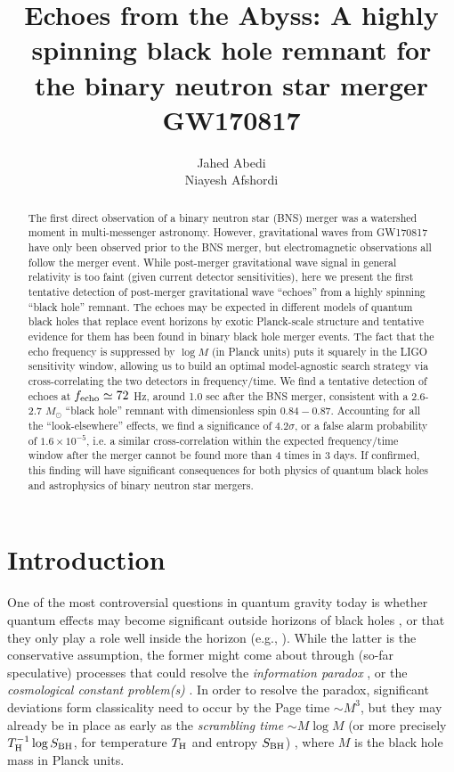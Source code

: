 \documentclass[12pt]{article}
\title{\Large Echoes from the Abyss: A highly spinning black hole remnant for the binary neutron star merger GW170817}
\author{Jahed Abedi \\ Niayesh Afshordi}
\begin{document}
\maketitle

\begin{abstract}
The first direct observation of a binary neutron star (BNS) merger was a watershed moment in multi-messenger astronomy.  However, gravitational waves from GW170817 have only been observed prior to the BNS merger, but electromagnetic observations all follow the merger event. While post-merger gravitational wave signal in general relativity is too faint (given current detector sensitivities), here we present the first tentative detection of post-merger gravitational wave ``echoes'' from a highly spinning ``black hole'' remnant. The echoes may be expected in different models of quantum black holes that replace event horizons by exotic Planck-scale structure and tentative evidence for them has been found in binary black hole merger events.  The fact that the echo frequency is suppressed by $\log M$ (in Planck units) puts it squarely in the LIGO sensitivity window, allowing us to build an optimal model-agnostic search strategy via cross-correlating the two detectors in frequency/time. We find a tentative detection of echoes at $f_{\rm echo} \simeq 72$ Hz, around 1.0 sec after the BNS merger, consistent with a 2.6-2.7 $M_\odot$ ``black hole'' remnant with dimensionless spin $0.84-0.87$. Accounting for all the ``look-elsewhere'' effects, we find a significance of $4.2 \sigma$, or a false alarm probability of $1.6\times 10^{-5}$, i.e. a similar cross-correlation within the expected frequency/time window after the merger cannot be found more than 4 times in 3 days. If confirmed, this finding will have significant consequences for both physics of quantum black holes and astrophysics of binary neutron star mergers.
\end{abstract}


\newpage
\section{Introduction}\label{Introduction}
One of the most controversial questions in quantum gravity today is whether quantum effects may become significant outside horizons of black holes \cite{Braunstein:2009my,Almheiri:2012rt,Maldacena:2013xja,Giddings:2017mym}, or that they only play a role well inside the horizon (e.g., \cite{Abedi:2015yga}).  While the latter is the conservative assumption, the former might come about through (so-far speculative) processes that could resolve the {\it information paradox} \cite{Almheiri:2012rt,Lunin:2001jy,Lunin:2002qf,Maldacena:2013xja}, or the {\it cosmological constant problem(s)} \cite{PrescodWeinstein:2009mp}. In order to resolve the paradox, significant deviations form classicality need to occur by the Page time $\sim M^3$, but they may already be in place as early as the {\it scrambling time} $\sim M \log M$ (or more precisely $T^{-1}_{\rm H} \log S_{\rm BH}$, for temperature $T_{\rm H}$ and entropy $S_{\rm BH}$) \cite{Hayden:2007cs, Sekino:2008he}, where $M$ is the black hole mass in Planck units. 
\end{document}
